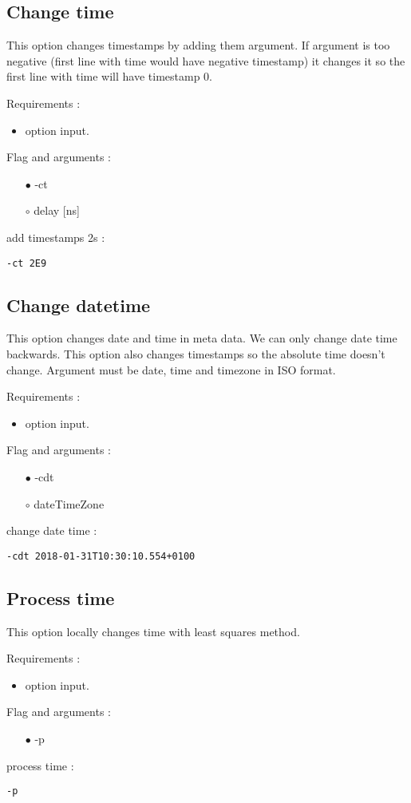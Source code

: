 \documentclass[english]{article}
\begin{document}
\subsection{Change time}
This option changes timestamps by adding them argument. If argument is too negative (first line with time would have negative timestamp) it changes it so the first line with time will have timestamp 0. 

\noindent Requirements : 
\begin{itemize}
\item option input. 
\end{itemize}
Flag and arguments :
\begin{itemize}
\item[$\bullet$] -ct
\item[$\circ$] delay [ns]
\end{itemize}
add timestamps 2s : 
\begin{lstlisting} 
-ct 2E9
\end{lstlisting}


\subsection{Change datetime}
This option changes date and time in meta data. We can only change date time backwards. This option also changes timestamps so the absolute time doesn't change. Argument must be date, time and timezone in ISO format. 

\noindent Requirements : 
\begin{itemize}
\item option input. 
\end{itemize}
Flag and arguments :
\begin{itemize}
\item[$\bullet$] -cdt
\item[$\circ$] dateTimeZone
\end{itemize}
change date time : 
\begin{lstlisting} 
-cdt 2018-01-31T10:30:10.554+0100
\end{lstlisting}


\subsection{Process time}
This option locally changes time with least squares method. 

\noindent Requirements : 
\begin{itemize}
\item option input. 
\end{itemize}
Flag and arguments :
\begin{itemize}
\item[$\bullet$] -p
\end{itemize}
process time : 
\begin{lstlisting} 
-p
\end{lstlisting}
\end{document}
